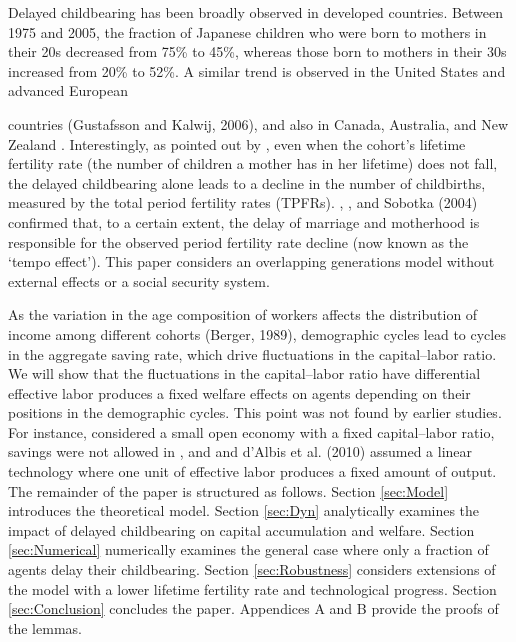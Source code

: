 \documentclass{MBE}%
\begin{document}
Delayed childbearing has been broadly observed in developed countries. Between 1975 and 2005, the
fraction of Japanese children who were born to mothers in their 20s  decreased from 75\% to 45\%,
whereas those born to mothers in their 30s increased from 20\% to 52\%. A similar trend is
observed in the United States and advanced European {countries\vvp{} (Gustafsson and Kalwij,
2006), and also in Canada, Australia, and New Zealand \citet{Hampel:1974}. Interestingly, as
pointed out by \citep{Efron:1979,Felsenstein:1985}, even when the cohort's lifetime fertility rate
(the number of children a mother has in her lifetime) does not fall, the delayed childbearing
alone leads to a decline in the number of childbirths, measured by the total period fertility
rates (TPFRs). \citet{Huber:2004}, \citet{Miller:1974}, and Sobotka (2004) confirmed that, to a
certain extent, the delay of marriage and motherhood is responsible for the observed period
fertility rate decline (now known as the `tempo effect'). This paper considers an overlapping
generations model
without external effects or a social security system. %

As the variation in the age composition of workers affects the distribution of income among
different cohorts (Berger, 1989), demographic cycles lead to cycles in the aggregate saving rate,
which drive fluctuations in the capital--labor ratio. We will show that the fluctuations in the
capital--labor ratio have differential  effective labor produces a fixed welfare effects on agents
depending on their positions in the demographic cycles. This point was not found by earlier
studies. For instance, \citet{Archibald_Roger:2002} considered a small open economy with a fixed
capital--labor ratio, savings were not allowed in \citet{Blouin_Butt_Roger:2005}, and
\citep{Bar-Hen_Kishino:2000} and d'Albis et al. (2010) assumed a linear technology where one unit
of effective labor produces a fixed amount of output. The remainder of the paper is structured as
follows. Section \ref{sec:Model} introduces the theoretical model. Section \ref{sec:Dyn}
analytically examines the impact of delayed childbearing on capital accumulation and welfare.
Section \ref{sec:Numerical} numerically examines the general case where only a fraction of agents
delay their childbearing. Section \ref{sec:Robustness} considers extensions of the model with a
lower lifetime fertility rate and technological progress. Section \ref{sec:Conclusion} concludes
the paper. Appendices A and B provide the proofs of the lemmas.

}
\end{document}
